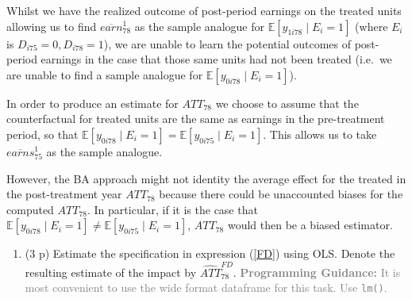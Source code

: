 \documentclass[
]{article}
\newenvironment{Shaded}{\begin{snugshade}}{\end{snugshade}}
\newcommand{\AttributeTok}[1]{\textcolor[rgb]{0.13,0.29,0.53}{#1}}
\newcommand{\FunctionTok}[1]{\textcolor[rgb]{0.13,0.29,0.53}{\textbf{#1}}}
\newcommand{\NormalTok}[1]{#1}
\newcommand{\OtherTok}[1]{\textcolor[rgb]{0.56,0.35,0.01}{#1}}
\newcommand{\SpecialCharTok}[1]{\textcolor[rgb]{0.81,0.36,0.00}{\textbf{#1}}}
\providecommand{\tightlist}{%
  \setlength{\itemsep}{0pt}\setlength{\parskip}{0pt}}
\begin{document}
\begin{enumerate}
  Whilst we have the realized outcome of post-period earnings on the
  treated units allowing us to find \(\overline{earn}_{78}^{1}\) as the
  sample analogue for \(\mathbb{E}[y_{1i78} \mid E_i = 1]\) (where
  \(E_i\) is \(D_{i75} = 0, D_{i78} = 1\)), we are unable to learn the
  potential outcomes of post-period earnings in the case that those same
  units had not been treated (i.e.~we are unable to find a sample
  analogue for \(\mathbb{E}[y_{0i78} \mid E_i = 1]\)).

  In order to produce an estimate for \({ATT}_{78}\) we choose to assume
  that the counterfactual for treated units are the same as earnings in
  the pre-treatment period, so that
  \(\mathbb{E}[y_{0i78} \mid E_i = 1] = \mathbb{E}[y_{0i75} \mid E_i = 1]\).
  This allows us to take \(\overline{earns}_{75}^{1}\) as the sample
  analogue.

  However, the BA approach might not identity the average effect for the
  treated in the post-treatment year \(ATT_{78}\) because there could be
  unaccounted biases for the computed \(ATT_{78}\). In particular, if it
  is the case that
  \(\mathbb{E}[y_{0i78} \mid E_i = 1] \neq \mathbb{E}[y_{0i75} \mid E_i = 1]\),
  \(ATT_{78}\) would then be a biased estimator.
\end{enumerate}

\begin{enumerate}
\def\labelenumi{\arabic{enumi}.}
\setcounter{enumi}{1}
\tightlist
\item
  (3 p) Estimate the specification in expression (\ref{FD}) using OLS.
  Denote the resulting estimate of the impact by
  \(\widehat{ATT}_{78}^{FD}\).
  \textcolor{gray}{\textbf{Programming Guidance:} It is most convenient to use the wide format dataframe for this task. Use \texttt{lm()}.}\label{item:fd}
\end{enumerate}

\begin{Shaded}
\end{Shaded}
\end{document}
